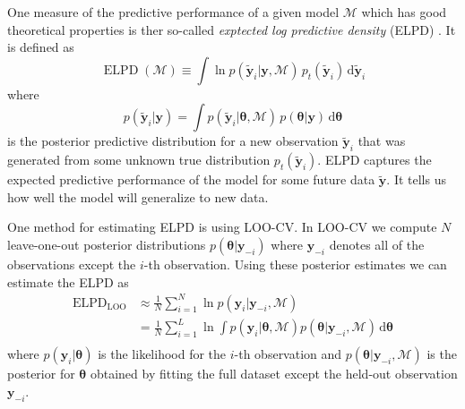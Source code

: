 \documentclass[12pt,dvipsnames]{report}
\newcommand{\ud}{\,\mathrm{d}}
\renewcommand{\vec}[1]{\boldsymbol{\mathbf{#1}}}
\begin{document}
One measure of the predictive performance of a given model $\mathcal{M}$ which has 
good theoretical properties is ther so-called 
\textsl{exptected log predictive density} (ELPD) 
\citep[see for example][]{10.1214/12-SS102}. It is defined as 
\begin{equation}
\operatorname{ELPD}(\mathcal{M})\equiv \int \ln p\left(\tilde{\vec y}_{i} \lvert \vec y, \mathcal{M}\right)\,p_{t}\left(\tilde{\vec y}_{i}\right) \ud \tilde{\vec y}_{i}
\end{equation}
where 
\begin{equation}
p(\tilde{\vec y}_i\lvert\vec y)=\int p\left(\tilde{\vec y}_{i} \lvert \vec \theta,\mathcal{M}\right)\,p(\vec\theta \lvert \vec y) \ud \vec\theta
\end{equation}
is the posterior predictive distribution for a new observation $\tilde{\vec y}_i$ that 
was generated from some unknown true distribution $p_t(\tilde{\vec y}_i)$.
ELPD captures the expected predictive performance of the model for some future data
$\tilde{\vec y}$.  It tells us how well the model will generalize to new data.

One method for estimating ELPD is using LOO-CV. In LOO-CV we compute $N$ leave-one-out 
posterior distributions $p(\vec\theta\lvert \vec{y}_{-i})$ where $\vec y_{-i}$ 
denotes all of the observations except the $i$-th observation. Using these 
posterior estimates we can estimate the ELPD as 
 \begin{align}
\mathrm{ELPD}_{\mathrm{LOO}} &\approx\frac{1}{N} \sum_{i=1}^{N} \ln p\left(\vec y_{i} \lvert \vec y_{-i},\mathcal{M}\right) \\
\label{eq:elpd_loo}
&=\frac{1}{N} \sum_{i=1}^{L} \ln\int p\left(\vec y_{i} \lvert \vec \theta, \mathcal{M}\right) p\left(\vec\theta \lvert \vec y_{-i},\mathcal{M}\right) \ud \vec\theta \\
\end{align}
where $p(\vec y_i\lvert \vec \theta)$ is the likelihood for the $i$-th observation 
and $p(\vec\theta\lvert \vec y_{-i},\mathcal{M})$ is the posterior for $\vec\theta$ 
obtained by fitting the full dataset except the held-out observation $\vec y_{-i}$.
\end{document}
